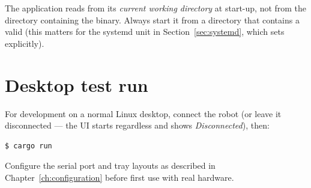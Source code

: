 \begin{note}
The application reads  from its \emph{current working directory}
at start-up, not from the directory containing the binary. Always start it from a
directory that contains a valid  (this matters for the systemd
unit in Section~\ref{sec:systemd}, which sets  explicitly).
\end{note}

\section{Desktop test run}

For development on a normal Linux desktop, connect the robot (or leave it
disconnected --- the UI starts regardless and shows \emph{Disconnected}), then:

\begin{lstlisting}[language=bash]
$ cargo run
\end{lstlisting}

Configure the serial port and tray layouts as described in
Chapter~\ref{ch:configuration} before first use with real hardware.
